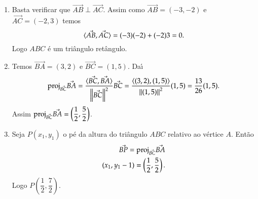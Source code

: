 \begin{exemplos}
\begin{enumerate}
\begin{solucao}
\begin{figure}[!h]

       \end{figure}
       \begin{enumerate}
         \item Basta verificar que $\vec{AB}\perp\vec{AC}$. Assim como $\vec{AB} = (-3,-2)$ e $\vec{AC} = (-2,3)$ temos
         \[
            \langle \vec{AB}, \vec{AC} \rangle = (-3)(-2) + (-2)3 = 0.
         \]
         Logo $ABC$ \'e um tri\^angulo ret\^angulo.
         \item Temos $\vec{BA} = (3,2)$ e $\vec{BC} = (1,5)$. Da{\'\i}
         \[
            {\rm proj}_{\vec{BC}}\vec{BA} = \dfrac{\langle \vec{BC}, \vec{BA} \rangle}{\left\Vert{\vec{BC}}\right\Vert^2}\vec{BC} = \dfrac{\langle (3,2), (1,5)\rangle}{\left\Vert{(1,5)}\right\Vert^2}(1,5) = \dfrac{13}{26}(1,5).
         \]
         Assim ${\rm proj}_{\vec{BC}}\vec{BA} = \left(\dfrac{1}{2},\dfrac{5}{2}\right)$.
         \item Seja $P(x_1, y_1)$ o p\'e da altura do tri\^angulo $ABC$ relativo ao v\'ertice $A$. Ent\~ao
         \begin{align*}
           \vec{BP} = {\rm proj}_{\vec{BC}}\vec{BA}\\
           (x_1, y_1 - 1) = \left(\dfrac{1}{2}, \dfrac{5}{2}\right).
         \end{align*}
         Logo $P\left(\dfrac{1}{2},\dfrac{7}{2}\right)$.
       \end{enumerate}
     \end{solucao}
  \end{enumerate}
\end{exemplos}

